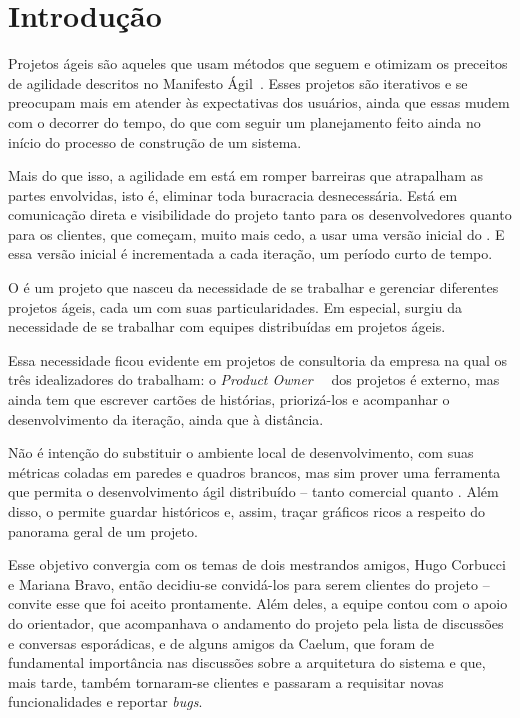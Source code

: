 \section{Introdução}
Projetos ágeis são aqueles que usam métodos que seguem e otimizam os preceitos de agilidade descritos no Manifesto Ágil~\cite{manifesto}. Esses projetos são iterativos e se preocupam mais em atender às expectativas dos usuários, ainda que essas mudem com o decorrer do tempo, do que com seguir um planejamento feito ainda no início do processo de construção de um sistema.

Mais do que isso, a agilidade em está em romper barreiras que atrapalham as partes envolvidas, isto é, eliminar toda buracracia desnecessária. Está em comunicação direta e visibilidade do projeto tanto para os desenvolvedores quanto para os clientes, que começam, muito mais cedo, a usar uma versão inicial do \software{}. E essa versão inicial é incrementada a cada iteração, um período curto de tempo. 

O \calopsita{} é um projeto que nasceu da necessidade de se trabalhar e gerenciar diferentes projetos ágeis, cada um com suas particularidades. Em especial, surgiu da necessidade de se trabalhar com equipes distribuídas em projetos ágeis. 

Essa necessidade ficou evidente em projetos de consultoria da empresa na qual os três idealizadores do \calopsita{} trabalham: o \textit{Product Owner}~\cite{po}~\cite{scrum} dos projetos é externo, mas ainda tem que escrever cartões de histórias, priorizá-los e acompanhar o desenvolvimento da iteração, ainda que à distância.

Não é intenção do \calopsita{} substituir o ambiente local de desenvolvimento, com suas métricas coladas em paredes e quadros brancos, mas sim prover uma ferramenta que permita o desenvolvimento ágil distribuído -- tanto comercial quanto \opensource{}. Além disso, o \calopsita{} permite guardar históricos e, assim, traçar gráficos ricos a respeito do panorama geral de um projeto.

Esse objetivo convergia com os temas de dois mestrandos amigos, Hugo Corbucci e Mariana Bravo, então decidiu-se convidá-los para serem clientes do projeto -- convite esse que foi aceito prontamente. Além deles, a equipe contou com o apoio do orientador, que acompanhava o andamento do projeto pela lista de discussões e conversas esporádicas, e de alguns amigos da Caelum, que foram de fundamental importância nas discussões sobre a arquitetura do sistema e que, mais tarde, também tornaram-se clientes e passaram a requisitar novas funcionalidades e reportar \textit{bugs}.

